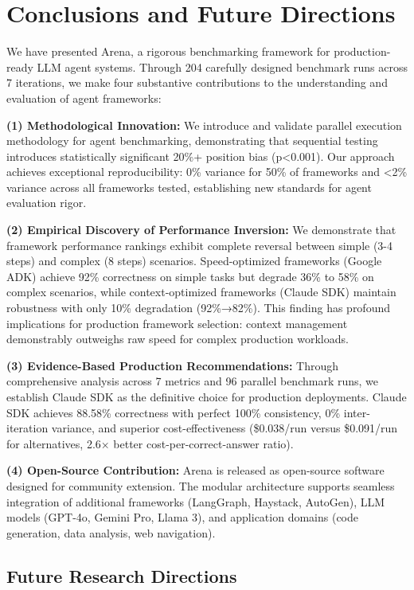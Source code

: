 \documentclass[sigconf,nonacm]{acmart}
\begin{document}
\section{Conclusions and Future Directions}

We have presented Arena, a rigorous benchmarking framework for production-ready LLM agent systems. Through 204 carefully designed benchmark runs across 7 iterations, we make four substantive contributions to the understanding and evaluation of agent frameworks:

\textbf{(1) Methodological Innovation:} We introduce and validate parallel execution methodology for agent benchmarking, demonstrating that sequential testing introduces statistically significant 20\%+ position bias (p<0.001). Our approach achieves exceptional reproducibility: 0\% variance for 50\% of frameworks and <2\% variance across all frameworks tested, establishing new standards for agent evaluation rigor.

\textbf{(2) Empirical Discovery of Performance Inversion:} We demonstrate that framework performance rankings exhibit complete reversal between simple (3-4 steps) and complex (8 steps) scenarios. Speed-optimized frameworks (Google ADK) achieve 92\% correctness on simple tasks but degrade 36\% to 58\% on complex scenarios, while context-optimized frameworks (Claude SDK) maintain robustness with only 10\% degradation (92\%→82\%). This finding has profound implications for production framework selection: context management demonstrably outweighs raw speed for complex production workloads.

\textbf{(3) Evidence-Based Production Recommendations:} Through comprehensive analysis across 7 metrics and 96 parallel benchmark runs, we establish Claude SDK as the definitive choice for production deployments. Claude SDK achieves 88.58\% correctness with perfect 100\% consistency, 0\% inter-iteration variance, and superior cost-effectiveness (\$0.038/run versus \$0.091/run for alternatives, 2.6× better cost-per-correct-answer ratio).

\textbf{(4) Open-Source Contribution:} Arena is released as open-source software designed for community extension. The modular architecture supports seamless integration of additional frameworks (LangGraph, Haystack, AutoGen), LLM models (GPT-4o, Gemini Pro, Llama 3), and application domains (code generation, data analysis, web navigation).

\subsection{Future Research Directions}
\end{document}
